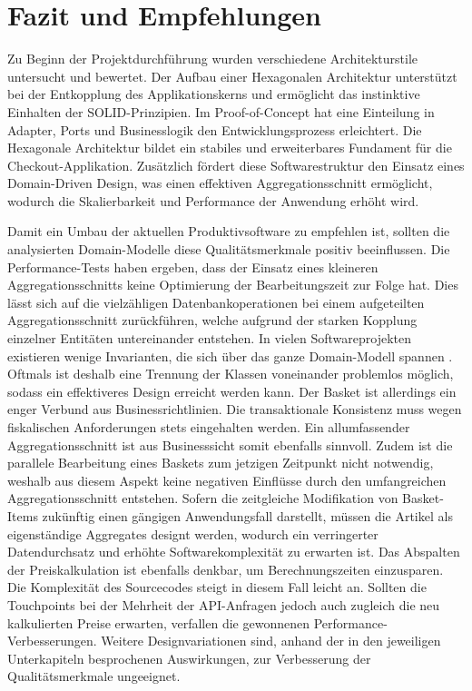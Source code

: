 

\chapter{Fazit und Empfehlungen}

Zu Beginn der Projektdurchführung wurden verschiedene Architekturstile untersucht und bewertet. Der Aufbau einer Hexagonalen Architektur unterstützt bei der Entkopplung des Applikationskerns und ermöglicht das instinktive Einhalten der SOLID-Prinzipien. Im Proof-of-Concept hat eine Einteilung in Adapter, Ports und Businesslogik den Entwicklungsprozess erleichtert. Die Hexagonale Architektur bildet ein stabiles und erweiterbares Fundament für die Checkout-Applikation. Zusätzlich fördert diese Softwarestruktur den Einsatz eines Domain-Driven Design, was einen effektiven Aggregationsschnitt ermöglicht, wodurch die Skalierbarkeit und Performance der Anwendung erhöht wird. 

Damit ein Umbau der aktuellen Produktivsoftware zu empfehlen ist, sollten die analysierten Domain-Modelle diese Qualitätsmerkmale positiv beeinflussen. Die Performance-Tests haben ergeben, dass der Einsatz eines kleineren Aggregationsschnitts keine Optimierung der Bearbeitungszeit zur Folge hat. Dies lässt sich auf die vielzähligen Datenbankoperationen bei einem aufgeteilten Aggregationsschnitt zurückführen, welche aufgrund der starken Kopplung einzelner Entitäten untereinander entstehen. In vielen Softwareprojekten existieren wenige Invarianten, die sich über das ganze Domain-Modell spannen \cite[S. 355ff.]{Vernon.2015}. Oftmals ist deshalb eine Trennung der Klassen voneinander problemlos möglich, sodass ein effektiveres Design erreicht werden kann. Der Basket ist allerdings ein enger Verbund aus Businessrichtlinien. Die transaktionale Konsistenz muss wegen fiskalischen Anforderungen stets eingehalten werden. Ein allumfassender Aggregationsschnitt ist aus Businesssicht somit ebenfalls sinnvoll. Zudem ist die parallele Bearbeitung eines Baskets zum jetzigen Zeitpunkt nicht notwendig, weshalb aus diesem Aspekt keine negativen Einflüsse durch den umfangreichen Aggregationsschnitt entstehen. Sofern die zeitgleiche Modifikation von Basket-Items zukünftig einen gängigen Anwendungsfall darstellt, müssen die Artikel als eigenständige Aggregates designt werden, wodurch ein verringerter Datendurchsatz und erhöhte Softwarekomplexität zu erwarten ist. Das Abspalten der Preiskalkulation ist ebenfalls denkbar, um Berechnungszeiten einzusparen. Die Komplexität des Sourcecodes steigt in diesem Fall leicht an. Sollten die Touchpoints bei der Mehrheit der API-Anfragen jedoch auch zugleich die neu kalkulierten Preise erwarten, verfallen die gewonnenen Performance-Verbesserungen. Weitere Designvariationen sind, anhand der in den jeweiligen Unterkapiteln besprochenen Auswirkungen, zur Verbesserung der Qualitätsmerkmale ungeeignet.

